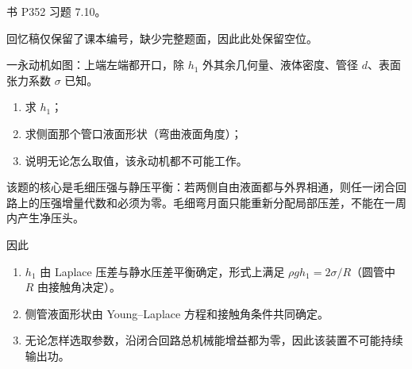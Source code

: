 \begin{question}
书 P352 习题 7.10。
\begin{solution}
回忆稿仅保留了课本编号，缺少完整题面，因此此处保留空位。
\end{solution}
\end{question}

\begin{question}
一永动机如图：上端左端都开口，除 $h_1$ 外其余几何量、液体密度、管径 $d$、表面张力系数 $\sigma$ 已知。
\begin{enumerate}[label=（\arabic*）,leftmargin=2.8em,itemsep=0.2em]
\item 求 $h_1$；
\item 求侧面那个管口液面形状（弯曲液面角度）；
\item 说明无论怎么取值，该永动机都不可能工作。
\end{enumerate}
\begin{solution}
该题的核心是毛细压强与静压平衡：若两侧自由液面都与外界相通，则任一闭合回路上的压强增量代数和必须为零。毛细弯月面只能重新分配局部压差，不能在一周内产生净压头。

因此
\begin{enumerate}[label=（\arabic*）,leftmargin=2.8em,itemsep=0.2em]
\item $h_1$ 由 Laplace 压差与静水压差平衡确定，形式上满足 $\rho g h_1=2\sigma/R$（圆管中 $R$ 由接触角决定）。
\item 侧管液面形状由 Young--Laplace 方程和接触角条件共同确定。
\item 无论怎样选取参数，沿闭合回路总机械能增益都为零，因此该装置不可能持续输出功。
\end{enumerate}
\end{solution}
\end{question}


